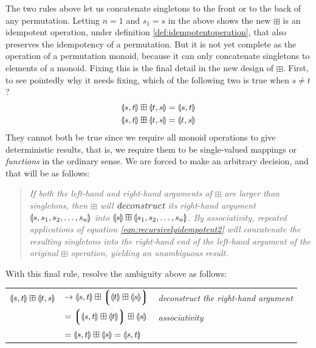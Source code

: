 The two rules above let us concatenate singletons to the front or to the back of any permutation. Letting $n=1$ and $s_1 =s$ in the above shows the new $\boxplus$ is an idempotent operation, under definition \ref{def:idempotentoperation}, that also preserves the idempotency of a permutation. But it is not yet complete as the operation of a permutation monoid, because it can only concatenate singletons to elements of a monoid. Fixing this is the final detail in the new design of $\boxplus$. First, to see pointedly why it needs fixing, which of the following two is true when $s\neq t$?
\begin{align}
  \llparenthesis s, t \rrparenthesis \boxplus \llparenthesis t, s \rrparenthesis &= \llparenthesis s, t \rrparenthesis
  \label{eqn:permutationambiguity}
  \\
  \nonumber
  \llparenthesis s, t \rrparenthesis \boxplus \llparenthesis t, s \rrparenthesis &= \llparenthesis t, s \rrparenthesis
\end{align}
They cannot both be true since we require all monoid operations to give deterministic results, that is, we require them to be single-valued mappings or \emph{functions} in the ordinary sense. We are forced to make an arbitrary decision, and that will be as follows:
\begin{quote}
  \emph{If both the left-hand and right-hand arguments of $\boxplus$ are larger than singletons, then $\boxplus$ will \textbf{deconstruct} its right-hand argument $\llparenthesis s,s_1,s_2,\ldots,s_n \rrparenthesis$ into $\llparenthesis s \rrparenthesis\boxplus\llparenthesis s_1,s_2,\ldots,s_n \rrparenthesis$. By associativity, repeated applications of equation \ref{eqn:recursivelyidempotent2} will concatenate the resulting singletons into the right-hand end of the left-hand argument of the original $\boxplus$ operation, yielding an unambiguous result.}
\end{quote}


With this final rule, resolve the ambiguity above as follows:
\begin{center}
\begin{tabular}{rll}
  $\llparenthesis s,t \rrparenthesis\boxplus\llparenthesis t,s \rrparenthesis$
    & $\rightarrow\llparenthesis s,t \rrparenthesis\boxplus
       \left\lgroup\llparenthesis t \rrparenthesis\boxplus\llparenthesis s \rrparenthesis\right\rgroup$
       & {\footnotesize\emph{deconstruct the right-hand argument}}\\
  {}&$= \left\lgroup\llparenthesis s,t \rrparenthesis\boxplus\llparenthesis t \rrparenthesis\right\rgroup\boxplus\llparenthesis s \rrparenthesis$
       & {\footnotesize\emph{associativity}}\\
  {}&$= \llparenthesis s,t \rrparenthesis\boxplus\llparenthesis s \rrparenthesis = \llparenthesis s,t \rrparenthesis$
       & {}
\end{tabular}
\end{center}


